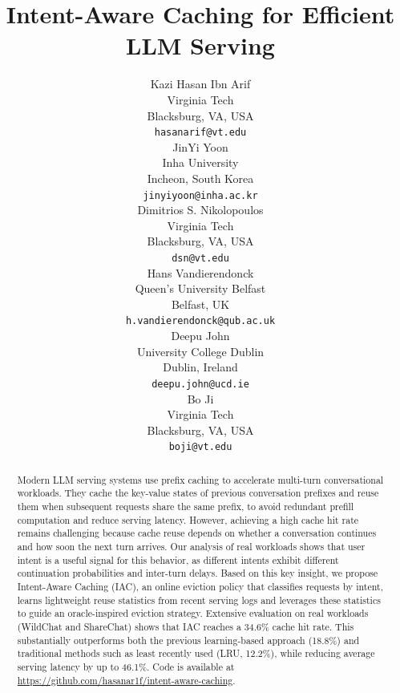 \documentclass{article}
\title{Intent-Aware Caching for Efficient LLM Serving}
\author{%
  Kazi Hasan Ibn Arif\\
  Virginia Tech\\
  Blacksburg, VA, USA\\
  \texttt{hasanarif@vt.edu} \\
  \And
  JinYi Yoon\\
  Inha University\\
  Incheon, South Korea\\
  \texttt{jinyiyoon@inha.ac.kr} \\
  \And
  Dimitrios S. Nikolopoulos\\
  Virginia Tech\\
  Blacksburg, VA, USA\\
  \texttt{dsn@vt.edu} \\
  \AND
  Hans Vandierendonck\\
  Queen's University Belfast\\
  Belfast, UK\\
  \texttt{h.vandierendonck@qub.ac.uk} \\
  \And
  Deepu John\\
  University College Dublin\\
  Dublin, Ireland\\
  \texttt{deepu.john@ucd.ie} \\
  \And
  Bo Ji\\
  Virginia Tech\\
  Blacksburg, VA, USA\\
  \texttt{boji@vt.edu} \\
}
\newcommand{\jiny}[1]{\textcolor{orange}{[Jiny: #1]}}
\newcommand{\hasan}[1]{\textcolor{blue}{[Hasan: #1]}}
\newcommand{\bo}[1]{\textcolor{red}{[Bo: #1]}}
\begin{document}
\maketitle





\begin{abstract}
Modern LLM serving systems use prefix caching to accelerate multi-turn conversational workloads. They cache the key-value states of previous conversation prefixes and reuse them when subsequent requests share the same prefix, to avoid redundant prefill computation and reduce serving latency. However, achieving a high cache hit rate remains challenging because cache reuse depends on whether a conversation continues and how soon the next turn arrives. Our analysis of real workloads shows that user intent is a useful signal for this behavior, as different intents exhibit different continuation probabilities and inter-turn delays. Based on this key insight, we propose Intent-Aware Caching (IAC), an online eviction policy that classifies requests by intent, learns lightweight reuse statistics from recent serving logs and leverages these statistics to guide an oracle-inspired eviction strategy. Extensive evaluation on real workloads (WildChat and ShareChat) shows that IAC reaches a 34.6\% cache hit rate. This substantially outperforms both the previous learning-based approach
(18.8\%) and traditional methods such as least recently used (LRU, 12.2\%), while reducing average serving latency by up to 46.1\%. Code is available at \url{https://github.com/hasanar1f/intent-aware-caching}.

%
\end{abstract}
\end{document}
